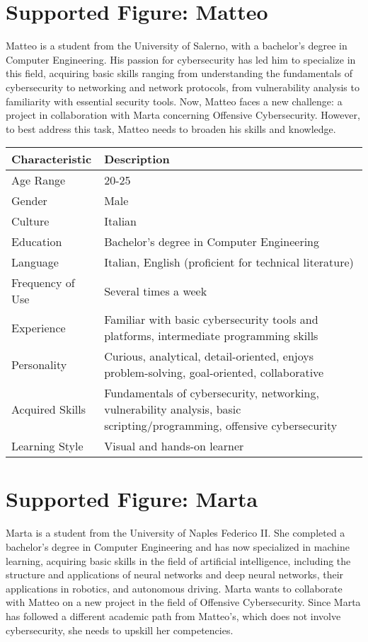 \section{Supported Figure: Matteo}
Matteo is a student from the University of Salerno, with a bachelor's degree in Computer Engineering. His passion for cybersecurity has led him to specialize in this field, acquiring basic skills ranging from understanding the fundamentals of cybersecurity to networking and network protocols, from vulnerability analysis to familiarity with essential security tools. Now, Matteo faces a new challenge: a project in collaboration with Marta concerning Offensive Cybersecurity. However, to best address this task, Matteo needs to broaden his skills and knowledge.

\begin{center}
    \begin{tabular}{|l|p{10cm}|}
    \hline
    \textbf{Characteristic} & \textbf{Description} \\
    \hline
    Age Range & 20-25 \\
    \hline
    Gender & Male \\
    \hline
    Culture & Italian \\
    \hline
    Education & Bachelor's degree in Computer Engineering \\
    \hline
    Language & Italian, English (proficient for technical literature) \\
    \hline
    Frequency of Use & Several times a week \\
    \hline
    Experience & Familiar with basic cybersecurity tools and platforms, intermediate programming skills \\
    \hline
    Personality & Curious, analytical, detail-oriented, enjoys problem-solving, goal-oriented, collaborative \\
    \hline
    Acquired Skills & Fundamentals of cybersecurity, networking, vulnerability analysis, basic scripting/programming, offensive cybersecurity \\
    \hline
    Learning Style & Visual and hands-on learner \\
    \hline
    \end{tabular}
    \end{center}
    
\newpage
\section{Supported Figure: Marta}
Marta is a student from the University of Naples Federico II. She completed a bachelor's degree in Computer Engineering and has now specialized in machine learning, acquiring basic skills in the field of artificial intelligence, including the structure and applications of neural networks and deep neural networks, their applications in robotics, and autonomous driving. Marta wants to collaborate with Matteo on a new project in the field of Offensive Cybersecurity. Since Marta has followed a different academic path from Matteo's, which does not involve cybersecurity, she needs to upskill her competencies.


